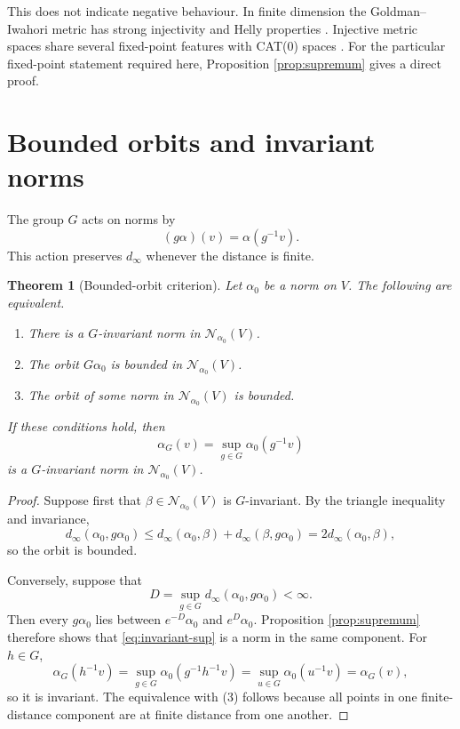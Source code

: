 \documentclass[12pt]{article}
\newtheorem{theorem}{Theorem}[section]
\theoremstyle{definition}
\theoremstyle{remark}
\newcommand{\Norm}{\mathscr N}
\newcommand{\dinf}{d_{\infty}}
\begin{document}
This does not indicate negative behaviour.  In finite dimension the
Goldman--\allowbreak Iwahori metric has strong injectivity and Helly
properties \cite{Haettel2022}.  Injective metric spaces share several
fixed-point features with CAT(0) spaces \cite{Lang2013}.  For the
particular fixed-point statement required here, Proposition
\ref{prop:supremum} gives a direct proof.

\section{Bounded orbits and invariant norms}
\label{sec:bounded}

The group $G$ acts on norms by
\begin{equation}\label{eq:group-action}
  (g\alpha)(v)=\alpha(g^{-1}v).
\end{equation}
This action preserves $\dinf$ whenever the distance is finite.

\begin{theorem}[Bounded-orbit criterion]\label{thm:bounded-orbit}
Let $\alpha_0$ be a norm on $V$.  The following are equivalent.
\begin{enumerate}
  \item There is a $G$-invariant norm in $\Norm_{\alpha_0}(V)$.
  \item The orbit $G\alpha_0$ is bounded in $\Norm_{\alpha_0}(V)$.
  \item The orbit of some norm in $\Norm_{\alpha_0}(V)$ is bounded.
\end{enumerate}
If these conditions hold, then
\begin{equation}\label{eq:invariant-sup}
  \alpha_G(v)=\sup_{g\in G}\alpha_0(g^{-1}v)
\end{equation}
is a $G$-invariant norm in $\Norm_{\alpha_0}(V)$.
\end{theorem}

\begin{proof}
Suppose first that $\beta\in\Norm_{\alpha_0}(V)$ is $G$-invariant.  By
the triangle inequality and invariance,
\[
 \dinf(\alpha_0,g\alpha_0)
 \leq\dinf(\alpha_0,\beta)+\dinf(\beta,g\alpha_0)
 =2\dinf(\alpha_0,\beta),
\]
so the orbit is bounded.

Conversely, suppose that
\[
 D=\sup_{g\in G}\dinf(\alpha_0,g\alpha_0)<\infty.
\]
Then every $g\alpha_0$ lies between $e^{-D}\alpha_0$ and
$e^D\alpha_0$.  Proposition \ref{prop:supremum} therefore shows that
\eqref{eq:invariant-sup} is a norm in the same component.  For
$h\in G$,
\[
 \alpha_G(h^{-1}v)
 =\sup_{g\in G}\alpha_0(g^{-1}h^{-1}v)
 =\sup_{u\in G}\alpha_0(u^{-1}v)
 =\alpha_G(v),
\]
so it is invariant.  The equivalence with (3) follows because all
points in one finite-distance component are at finite distance from one
another.
\end{proof}
\end{document}
